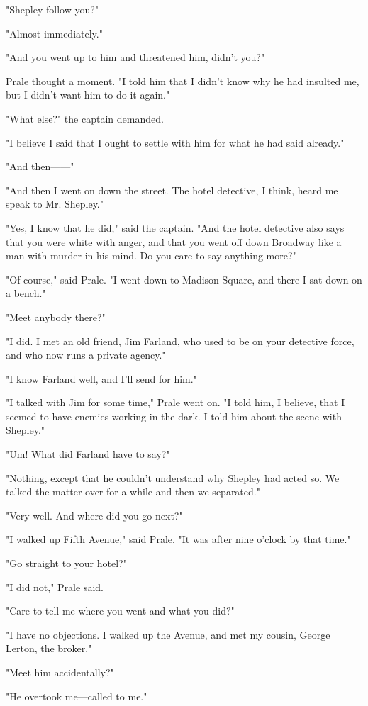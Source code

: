 \documentclass{novel}
\begin{document}
"Shepley follow you?"

"Almost immediately."

"And you went up to him and threatened him, didn't you?"

Prale thought a moment. "I told him that I didn't know why he had insulted me, but I didn't want him to do it again."

"What else?" the captain demanded.

"I believe I said that I ought to settle with him for what he had said already."

"And then------"

"And then I went on down the street. The hotel detective, I think, heard me speak to Mr. Shepley."

"Yes, I know that he did," said the captain. "And the hotel detective also says that you were white with anger, and that you went off down Broadway like a man with murder in his mind. Do you care to say anything more?"

"Of course," said Prale. "I went down to Madison Square, and there I sat down on a bench."

"Meet anybody there?"

"I did. I met an old friend, Jim Farland, who used to be on your detective force, and who now runs a private agency."

"I know Farland well, and I'll send for him."

"I talked with Jim for some time," Prale went on. "I told him, I believe, that I seemed to have enemies working in the dark. I told him about the scene with Shepley."

"Um! What did Farland have to say?"

"Nothing, except that he couldn't understand why Shepley had acted so. We talked the matter over for a while and then we separated."

"Very well. And where did you go next?"

"I walked up Fifth Avenue," said Prale. "It was after nine o'clock by that time."

"Go straight to your hotel?"

"I did not," Prale said.

"Care to tell me where you went and what you did?"

"I have no objections. I walked up the Avenue, and met my cousin, George Lerton, the broker."

"Meet him accidentally?"

"He overtook me---called to me."
\end{document}
